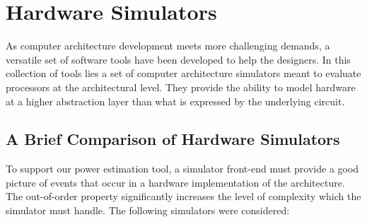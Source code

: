 \section{Hardware Simulators}

As computer architecture development meets more challenging demands, a versatile
set of software tools have been developed to help the designers. In this
collection of tools lies a set of computer architecture simulators meant to
evaluate processors at the architectural level. They provide the ability to
model hardware at a higher abstraction layer than what is expressed by the
underlying circuit.

\subsection{A Brief Comparison of Hardware Simulators}
\label{subsec:simulators}
To support our power estimation tool, a simulator front-end must provide a good
picture of events that occur in a hardware implementation of the architecture.
The out-of-order property significantly increases the level of complexity which
the simulator must handle. The following simulators were considered:

